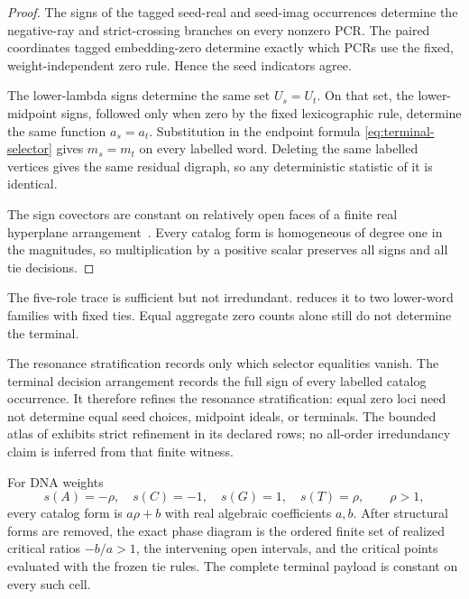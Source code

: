 \begin{proof}
The signs of the tagged seed-real and seed-imag occurrences determine the
negative-ray and strict-crossing branches on every nonzero PCR.  The paired
coordinates tagged embedding-zero determine exactly which PCRs use the
fixed, weight-independent zero rule.  Hence the seed indicators agree.

The lower-lambda signs determine the same set $U_s=U_t$.  On that set, the
lower-midpoint signs, followed only when zero by the fixed lexicographic rule,
determine the same function $a_s=a_t$.  Substitution in the endpoint formula
\eqref{eq:terminal-selector} gives $m_s=m_t$ on every labelled word.  Deleting
the same labelled vertices gives the same residual digraph, so any
deterministic statistic of it is identical.

The sign covectors are constant on relatively open faces of a finite real
hyperplane arrangement~\cite{BjornerEtAl1999}.  Every catalog form is
homogeneous of degree one in the magnitudes, so multiplication by a positive
scalar preserves all signs and all tie decisions.
\end{proof}

The five-role trace is sufficient but not irredundant.
 reduces it to two lower-word families with fixed ties.
Equal aggregate zero counts alone still do not determine the terminal.

\begin{remark}
\label{rem:resonance-terminal-strata}
The resonance stratification records only which selector equalities vanish.
The terminal decision arrangement records the full sign of every labelled
catalog occurrence.  It therefore refines the resonance stratification:
equal zero loci need not determine equal seed choices, midpoint ideals, or
terminals.  The bounded atlas of  exhibits strict
refinement in its declared rows; no all-order irredundancy claim is inferred
from that finite witness.
\end{remark}

\begin{corollary}
\label{cor:dna-phase}
For DNA weights
\begin{equation}
  s(A)=-\rho,\quad s(C)=-1,\quad s(G)=1,\quad s(T)=\rho,
  \qquad \rho>1,                                                        \label{eq:dna-weights}
\end{equation}
every catalog form is $a\rho+b$ with real algebraic coefficients $a,b$.
After structural forms are removed, the exact phase diagram is the ordered
finite set of realized critical ratios $-b/a>1$, the intervening open
intervals, and the critical points evaluated with the frozen tie rules.  The
complete terminal payload is constant on every such cell.
\end{corollary}

